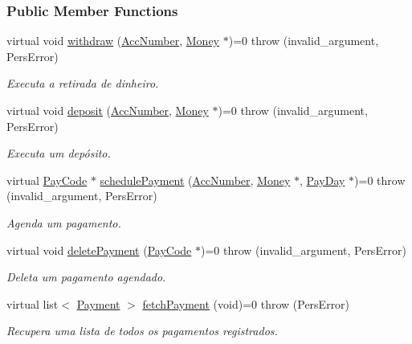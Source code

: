 \subsubsection*{Public Member Functions}
\begin{DoxyCompactItemize}
\item 
virtual void \hyperlink{classTransacAdm_a128750caeeec2cd48a4a01e6ce9f701c}{withdraw} (\hyperlink{classAccNumber}{Acc\-Number}, \hyperlink{classMoney}{Money} $\ast$)=0  throw (invalid\-\_\-argument, Pers\-Error)
\begin{DoxyCompactList}\small\item\em Executa a retirada de dinheiro. \end{DoxyCompactList}\item 
virtual void \hyperlink{classTransacAdm_a9b6ffc8a521600094eb13510edcb33d7}{deposit} (\hyperlink{classAccNumber}{Acc\-Number}, \hyperlink{classMoney}{Money} $\ast$)=0  throw (invalid\-\_\-argument, Pers\-Error)
\begin{DoxyCompactList}\small\item\em Executa um depósito. \end{DoxyCompactList}\item 
virtual \hyperlink{classPayCode}{Pay\-Code} $\ast$ \hyperlink{classTransacAdm_a6f350bc661f1a6460a31a0b02ccb8d3f}{schedule\-Payment} (\hyperlink{classAccNumber}{Acc\-Number}, \hyperlink{classMoney}{Money} $\ast$, \hyperlink{classPayDay}{Pay\-Day} $\ast$)=0  throw (invalid\-\_\-argument, Pers\-Error)
\begin{DoxyCompactList}\small\item\em Agenda um pagamento. \end{DoxyCompactList}\item 
virtual void \hyperlink{classTransacAdm_a76f27b0fc9e604695c4c601839d3b441}{delete\-Payment} (\hyperlink{classPayCode}{Pay\-Code} $\ast$)=0  throw (invalid\-\_\-argument, Pers\-Error)
\begin{DoxyCompactList}\small\item\em Deleta um pagamento agendado. \end{DoxyCompactList}\item 
virtual list$<$ \hyperlink{classPayment}{Payment} $>$ \hyperlink{classTransacAdm_ab3c02884c14540c1f520339581e88371}{fetch\-Payment} (void)=0  throw (\-Pers\-Error)
\begin{DoxyCompactList}\small\item\em Recupera uma lista de todos os pagamentos registrados. \end{DoxyCompactList}\end{DoxyCompactItemize}


